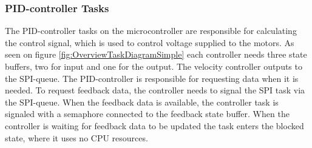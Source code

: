 \documentclass[../../main.tex]{subfiles}
\begin{document}
\subsubsection*{PID-controller Tasks}
The PID-controller tasks on the microcontroller are responsible for calculating the control signal, which is used to control voltage supplied to the motors. As seen on figure \ref{fig:OverviewTaskDiagramSimple} each controller needs three state buffers, two for input and one for the output. The velocity controller outputs to the SPI-queue. The PID-controller is responsible for requesting data when it is needed. To request feedback data, the controller needs to signal the SPI task via the SPI-queue. When the feedback data is available, the controller task is signaled with a semaphore connected to the feedback state buffer. When the controller is waiting for feedback data to be updated the task enters the blocked state, where it uses no CPU resources. 



\end{document}
